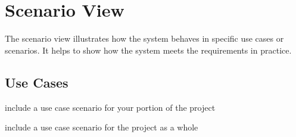 \section{Scenario View}

The scenario view illustrates how the system behaves in specific use cases or scenarios. 
It helps to show how the system meets the requirements in practice.

\subsection{Use Cases}

include a use case scenario for your portion of the project

include a use case scenario for the project as a whole